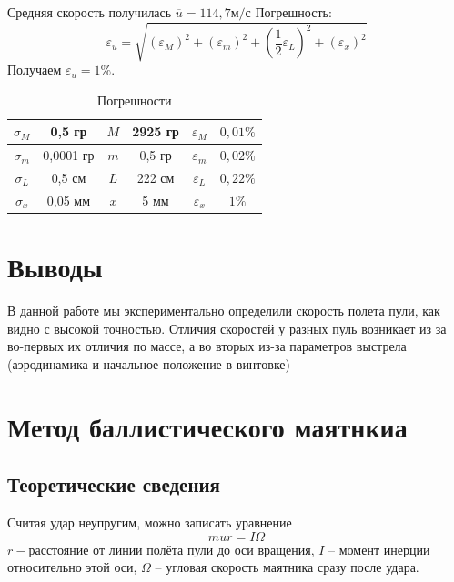 \documentclass[a4paper]{article}
\begin{document}
Средняя скорость получилась $\overline{u} = 114,7 м/с$
Погрешность:
\[
    \varepsilon_{u} = \sqrt{\left(\varepsilon_{M}\right)^2 + \left(\varepsilon_{m}\right)^2 + \left(\frac{1}{2}\varepsilon_{L}\right)^2 + \left(\varepsilon_{x}\right)^2}
\]
Получаем $\varepsilon_{u} = 1\%$. 
\begin{table}[h!]
\begin{center}
\begin{tabular}{|c|c|c|c|c|c|}
\hline
$\sigma_{M}$ & 0,5 гр & $M$ & 2925 гр   & $\varepsilon_{M}$ & $0,01\%$  \\ \hline
$\sigma_{m}$ & 0,0001 гр & $m$ & 0,5 гр   & $\varepsilon_{m}$ & $0,02\%$ \\ \hline
$\sigma_{L}$ & 0,5 см   & $L$ & 222 см    & $\varepsilon_{L}$ & $0,22\%$  \\ \hline
$\sigma_{x}$ & 0,05 мм  & $x$ & 5 мм & $\varepsilon_{x}$ & $1\%$ \\ \hline
\end{tabular}
\caption{Погрешности}
\end{center}
\end{table}

\section{Выводы}

В данной работе мы экспериментально определили скорость полета пули, как видно с высокой точностью. Отличия скоростей у разных пуль возникает из за во-первых их отличия по массе, а во вторых из-за параметров выстрела (аэродинамика и начальное положение в винтовке)

\newpage

\section{Метод баллистического маятнкиа}

\subsection{Теоретические сведения}
Считая удар неупругим, можно записать уравнение
	$$mur=I \Omega$$
	$r-$расстояние от линии полёта пули до оси вращения, $I$ -- момент инерции относительно этой оси, $\Omega$ -- угловая скорость маятника сразу после удара.
	
\end{document}
